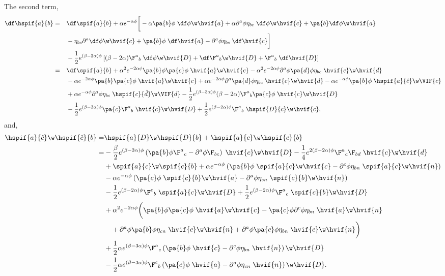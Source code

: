 The second term,
\begin{align}
  \df\hspif{a}{b} =&\quad \df \spif{a}{b} +\alpha e^{-\alpha\phi}\bigg[-\alpha\pa{b}\phi\;\df\phi\w\hvif{a} + \alpha\partial^a \phi \eta_{bc}\;\df\phi\w\hvif{c} + \pa{b}\df\phi\w\hvif{a} \notag\\
    &\quad- \eta_{b c}\partial^a\df\phi\w\hvif{c} + \pa{b}\phi\;\df\hvif{a} - \partial^a\phi\eta_{bc}\; \df\hvif{c}\bigg]\nonumber\\
  &\quad - \frac{1}{2}e^{(\beta-2\alpha)\phi}\left[ (\beta-2\alpha)\F^a{}_b\;\df\phi\w\hvif{D} + \df\F^a{}_b\w\hvif{D} + \F^a{}_b\;\df\hvif{D}\right]\notag\\
  =&\quad \df\spif{a}{b} + \alpha^2 e^{-2\alpha\phi}\pa{b}\phi\pa{c}\phi\;\hvif{a}\w\hvif{c} - \alpha^2 e^{-2\alpha\phi}\partial^{a}\phi\pa{d}\phi\eta_{bc}\;\hvif{c}\w\hvif{d}\notag\\
    &\quad- \alpha e^{-2\alpha\phi} \pa{b}\pa{c}\phi\; \hvif{a}\w\hvif{c} + \alpha e^{-2\alpha\phi} \partial^{a}\pa{d}\phi\eta_{bc}\; \hvif{c}\w\hvif{d} - \alpha e^{-\alpha\phi} \pa{b}\phi \;\hspif{a}{\hat{c}}\w\VIF{c}\notag\\
  &\quad + \alpha e^{-\alpha\phi} \partial^{a}\phi \eta_{bc}\;\hspif{c}{\hat{d}}\w\VIF{d} - \frac{1}{2} e^{(\beta-3\alpha)\phi}(\beta-2\alpha)\F^a{}_b\pa{c}\phi\;\hvif{c}\w\hvif{D}\\
&\quad - \frac{1}{2}e^{(\beta-3\alpha)\phi} \pa{c}\F^a{}_b\;\hvif{c}\w\hvif{D} + \frac{1}{2}e^{(\beta-2\alpha)\phi}\F^a{}_b\;\hspif{D}{c}\w\hvif{c},\notag
\end{align}
and,
\begin{align}
  \hspif{a}{\hat{c}}\w\hspif{\hat{c}}{b} =& \hspif{a}{D}\w\hspif{D}{b} + \hspif{a}{{c}}\w\hspif{{c}}{b} \notag\\
  =& -\frac{\beta}{2} e^{(\beta-3\alpha)\phi}\left(\pa{b}\phi \F^a{}_c - \partial^{a}\phi \F_{bc}\right)\;\hvif{c}\w\hvif{D} -\frac{1}{4}e^{2(\beta-2\alpha)\phi}\F^a{}_c \F_{bd}\;\hvif{c}\w\hvif{d}\notag\\
  & + \spif{a}{c}\w\spif{c}{b} + \alpha e^{-\alpha\phi}\left(\pa{b}\phi\;\spif{a}{c}\w\hvif{c} - \partial^c\phi\eta_{bn}\;\spif{a}{c}\w\hvif{n}  \right) \notag\\
  &-  \alpha e^{-\alpha\phi}\left(\pa{c}\phi\;\spif{c}{b}\w\hvif{a} - \partial^a\phi\eta_{cn}\;\spif{c}{b}\w\hvif{n}  \right)\notag\\
  & -\frac{1}{2} e^{(\beta-2\alpha)\phi}\F^c{}_b\;\spif{a}{c}\w\hvif{D} + \frac{1}{2} e^{(\beta-2\alpha)\phi}\F^a{}_c\;\spif{c}{b}\w\hvif{D} \notag\\
  &  + \alpha^2 e^{-2\alpha\phi}\bigg(\pa{b}\phi\pa{c}\phi\;\hvif{a}\w\hvif{c}  - \pa{c}\phi\partial^c\phi\eta_{bn}\;\hvif{a}\w\hvif{n}\notag\\
  &\quad + \partial^a\phi\pa{b}\phi\eta_{cn}\;\hvif{c}\w\hvif{n} + \partial^a\phi\pa{c}\phi\eta_{bn}\;\hvif{c}\w\hvif{n}\bigg)\notag\\
   & + \frac{1}{2}\alpha e^{(\beta-3\alpha)\phi}\F^a{}_c\left( \pa{b}\phi\;\hvif{c} - \partial^c\phi\eta_{bn}\;\hvif{n}\right)\w\hvif{D} \notag\\
  &- \frac{1}{2}\alpha e^{(\beta-3\alpha)\phi}\F^c{}_b\left( \pa{c}\phi\;\hvif{a} - \partial^a\phi\eta_{cn}\;\hvif{n}\right)\w\hvif{D}.
\end{align}

